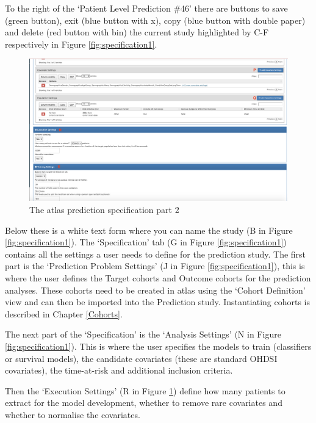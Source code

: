 \documentclass[11pt]{book}
\begin{document}
To the right of the `Patient Level Prediction \#46' there are buttons to
save (green button), exit (blue button with x), copy (blue button with
double paper) and delete (red button with bin) the current study
highlighted by C-F respectively in Figure \ref{fig:specification1}.

\begin{figure}
\includegraphics[width=1\linewidth]{images/PatientLevelPrediction/atlasImplementation/specification_p2} \caption{The atlas prediction specification part 2}\label{fig:specification2}
\end{figure}

Below these is a white text form where you can name the study (B in
Figure \ref{fig:specification1}). The `Specification' tab (G in Figure
\ref{fig:specification1}) contains all the settings a user needs to
define for the prediction study. The first part is the `Prediction
Problem Settings' (J in Figure \ref{fig:specification1}), this is where
the user defines the Target cohorts and Outcome cohorts for the
prediction analyses. These cohorts need to be created in atlas using the
`Cohort Definition' view and can then be imported into the Prediction
study. Instantiating cohorts is described in Chapter \ref{Cohorts}.

The next part of the `Specification' is the `Analysis Settings' (N in
Figure \ref{fig:specification1}). This is where the user specifies the
models to train (classifiers or survival models), the candidate
covariates (these are standard OHDSI covariates), the time-at-risk and
additional inclusion criteria.

Then the `Execution Settings' (R in Figure \ref{fig:specification2})
define how many patients to extract for the model development, whether
to remove rare covariates and whether to normalise the covariates.
\end{document}
